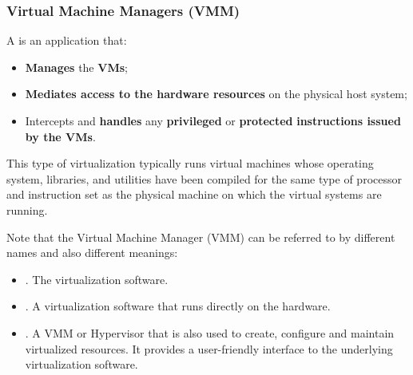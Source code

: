 \newpage

\subsubsection{Virtual Machine Managers (VMM)}\label{subsubsection: Virtual Machine Managers (VMM)}

A  is an application that:
\begin{itemize}
    \item \textbf{Manages} the \textbf{VMs};
    \item \textbf{Mediates access to the hardware resources} on the physical host system;
    \item Intercepts and \textbf{handles} any \textbf{privileged} or \textbf{protected} \textbf{instructions issued by the VMs}.
\end{itemize}
This type of virtualization typically runs virtual machines whose operating system, libraries, and utilities have been compiled for the same type of processor and instruction set as the physical machine on which the virtual systems are running.

\highspace
Note that the Virtual Machine Manager (VMM) can be referred to by different names and also different meanings:
\begin{itemize}
    \item {}. The virtualization software.

    \item {}. A virtualization software that runs directly on the hardware.

    \item {}. A VMM or Hypervisor that is also used to create, configure and maintain virtualized resources. It provides a user-friendly interface to the underlying virtualization software.
\end{itemize}

